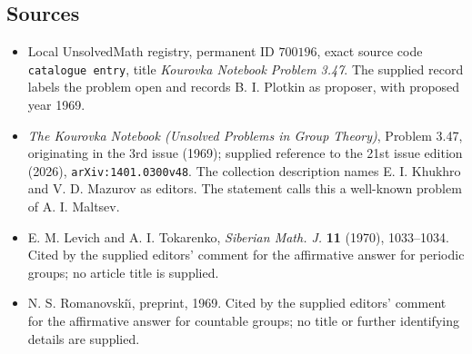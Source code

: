 \documentclass[11pt]{article}
\begin{document}
\subsection{Sources}
\begin{itemize}
\item Local UnsolvedMath registry, permanent ID \(700196\), exact source code \texttt{catalogue entry}, title \emph{Kourovka Notebook Problem 3.47}. The supplied record labels the problem open and records B. I. Plotkin as proposer, with proposed year 1969.
\item \emph{The Kourovka Notebook (Unsolved Problems in Group Theory)}, Problem 3.47, originating in the 3rd issue (1969); supplied reference to the 21st issue edition (2026), \texttt{arXiv:1401.0300v48}. The collection description names E. I. Khukhro and V. D. Mazurov as editors. The statement calls this a well-known problem of A. I. Maltsev.
\item E. M. Levich and A. I. Tokarenko, \emph{Siberian Math. J.} \textbf{11} (1970), 1033--1034. Cited by the supplied editors' comment for the affirmative answer for periodic groups; no article title is supplied.
\item N. S. Romanovski\u{\i}, preprint, 1969. Cited by the supplied editors' comment for the affirmative answer for countable groups; no title or further identifying details are supplied.
\end{itemize}
\end{document}
